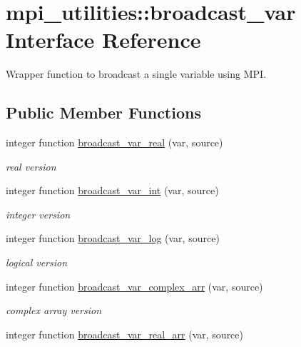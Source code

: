 \hypertarget{interfacempi__utilities_1_1broadcast__var}{}\section{mpi\+\_\+utilities\+:\+:broadcast\+\_\+var Interface Reference}
\label{interfacempi__utilities_1_1broadcast__var}


Wrapper function to broadcast a single variable using M\+PI.  


\subsection*{Public Member Functions}
\begin{DoxyCompactItemize}
\item 
integer function \hyperlink{interfacempi__utilities_1_1broadcast__var_a85b3681ed5fea5f629fc58a01db83667}{broadcast\+\_\+var\+\_\+real} (var, source)
\begin{DoxyCompactList}\small\item\em real version \end{DoxyCompactList}\item 
integer function \hyperlink{interfacempi__utilities_1_1broadcast__var_a2cde4dd2966657e187d4a85370844e87}{broadcast\+\_\+var\+\_\+int} (var, source)
\begin{DoxyCompactList}\small\item\em integer version \end{DoxyCompactList}\item 
integer function \hyperlink{interfacempi__utilities_1_1broadcast__var_a7f9573536861cc5fb907d8429bec547d}{broadcast\+\_\+var\+\_\+log} (var, source)
\begin{DoxyCompactList}\small\item\em logical version \end{DoxyCompactList}\item 
integer function \hyperlink{interfacempi__utilities_1_1broadcast__var_aec408c072cf25bd06f02ff08fef359ef}{broadcast\+\_\+var\+\_\+complex\+\_\+arr} (var, source)
\begin{DoxyCompactList}\small\item\em complex array version \end{DoxyCompactList}\item 
integer function \hyperlink{interfacempi__utilities_1_1broadcast__var_aa188bca3f7af8445962cb988bf9da5d2}{broadcast\+\_\+var\+\_\+real\+\_\+arr} (var, source)

\end{DoxyCompactItemize}

